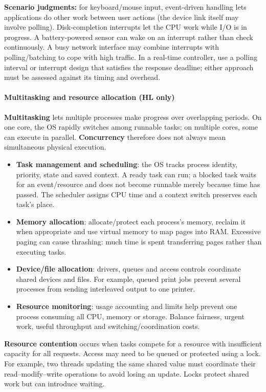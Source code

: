 \documentclass[a4paper,12pt]{article}
\begin{document}
\textbf{Scenario judgments:} for keyboard/mouse input, event-driven handling lets applications do other work between user actions (the device link itself may involve polling). Disk-completion interrupts let the CPU work while I/O is in progress. A battery-powered sensor can wake on an interrupt rather than check continuously. A busy network interface may combine interrupts with polling/batching to cope with high traffic. In a real-time controller, use a polling interval or interrupt design that satisfies the response deadline; either approach must be assessed against its timing and overhead.

\paragraph{Multitasking and resource allocation (HL only)}
\textbf{Multitasking} lets multiple processes make progress over overlapping periods. On one core, the OS rapidly switches among runnable tasks; on multiple cores, some can execute in parallel. \textbf{Concurrency} therefore does not always mean simultaneous physical execution.
\begin{itemize}
    \item \textbf{Task management and scheduling}: the OS tracks process identity, priority, state and saved context. A ready task can run; a blocked task waits for an event/resource and does not become runnable merely because time has passed. The scheduler assigns CPU time and a context switch preserves each task's place.
    \item \textbf{Memory allocation}: allocate/protect each process's memory, reclaim it when appropriate and use virtual memory to map pages into RAM. Excessive paging can cause thrashing: much time is spent transferring pages rather than executing tasks.
    \item \textbf{Device/file allocation}: drivers, queues and access controls coordinate shared devices and files. For example, queued print jobs prevent several processes from sending interleaved output to one printer.
    \item \textbf{Resource monitoring}: usage accounting and limits help prevent one process consuming all CPU, memory or storage. Balance fairness, urgent work, useful throughput and switching/coordination costs.
\end{itemize}
\textbf{Resource contention} occurs when tasks compete for a resource with insufficient capacity for all requests. Access may need to be queued or protected using a lock. For example, two threads updating the same shared value must coordinate their read--modify--write operations to avoid losing an update. Locks protect shared work but can introduce waiting.
\end{document}
